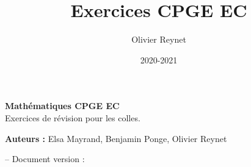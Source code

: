 \documentclass[french,12pt,a4paper]{book}
\author{Olivier Reynet}
\title{Exercices CPGE EC}
\date{2020-2021}
\begin{document}
	
	\begin{titlepage}
		\begin{center}
			\vspace*{5cm}
			
			\textbf{\Huge Mathématiques CPGE EC\\}
					   \vspace{1cm}
			Exercices de révision pour les colles. 

							\vfill
			
			\textbf{Auteurs : } Elsa Mayrand, Benjamin Ponge, Olivier Reynet
			

					\vfill
		
			

	
			\date{}
		   \vspace{0.5cm}
  -- Document version : 
			\vspace{1.5cm}
		\end{center}
	\end{titlepage}
	

	\tableofcontents
	
	
	
	
	
	
    
\end{document}
